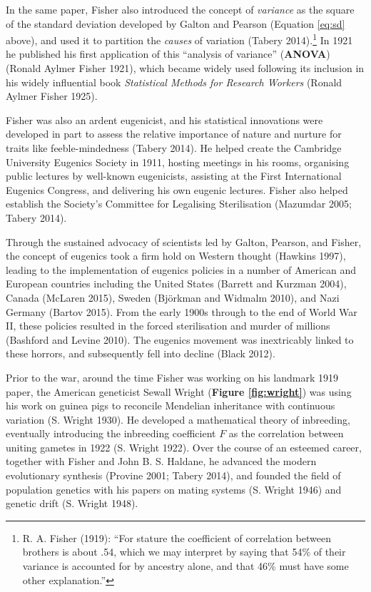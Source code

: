 \documentclass[
]{book}
\begin{document}
In the same paper, Fisher also introduced the concept of \emph{variance} as the square of the standard deviation developed by Galton and Pearson (Equation \eqref{eq:sd} above), and used it to partition the \emph{causes} of variation (Tabery 2014).\footnote{R. A. Fisher (1919): ``For stature the coefficient of correlation between brothers is about .54, which we may interpret by saying that 54\% of their variance is accounted for by ancestry alone, and that 46\% must have some other explanation.''} In 1921 he published his first application of this ``analysis of variance'' (\textbf{ANOVA}) (Ronald Aylmer Fisher 1921), which became widely used following its inclusion in his widely influential book \emph{Statistical Methods for Research Workers} (Ronald Aylmer Fisher 1925).

Fisher was also an ardent eugenicist, and his statistical innovations were developed in part to assess the relative importance of nature and nurture for traits like feeble-mindedness (Tabery 2014). He helped create the Cambridge University Eugenics Society in 1911, hosting meetings in his rooms, organising public lectures by well-known eugenicists, assisting at the First International Eugenics Congress, and delivering his own eugenic lectures. Fisher also helped establish the Society's Committee for Legalising Sterilisation (Mazumdar 2005; Tabery 2014).

Through the sustained advocacy of scientists led by Galton, Pearson, and Fisher, the concept of eugenics took a firm hold on Western thought (Hawkins 1997), leading to the implementation of eugenics policies in a number of American and European countries including the United States (Barrett and Kurzman 2004), Canada (McLaren 2015), Sweden (Björkman and Widmalm 2010), and Nazi Germany (Bartov 2015). From the early 1900s through to the end of World War II, these policies resulted in the forced sterilisation and murder of millions (Bashford and Levine 2010). The eugenics movement was inextricably linked to these horrors, and subsequently fell into decline (Black 2012).

Prior to the war, around the time Fisher was working on his landmark 1919 paper, the American geneticist Sewall Wright (\textbf{Figure \ref{fig:wright}}) was using his work on guinea pigs to reconcile Mendelian inheritance with continuous variation (S. Wright 1930). He developed a mathematical theory of inbreeding, eventually introducing the inbreeding coefficient \(F\) as the correlation between uniting gametes in 1922 (S. Wright 1922). Over the course of an esteemed career, together with Fisher and John B. S. Haldane, he advanced the modern evolutionary synthesis (Provine 2001; Tabery 2014), and founded the field of population genetics with his papers on mating systems (S. Wright 1946) and genetic drift (S. Wright 1948).
\end{document}

